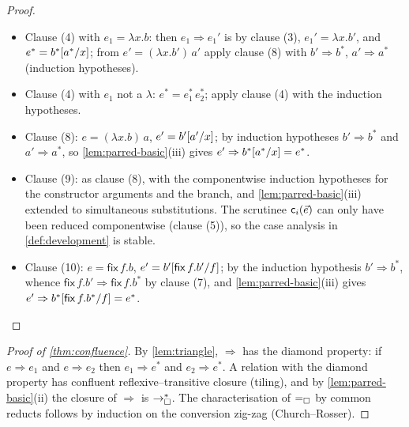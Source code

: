 \begin{proof}
\begin{itemize}[leftmargin=2em]
  is designed for; the symmetric configuration --- step fires the
  redex, development likewise --- is clause (9) below.)
\item Clause (4) with $e_1 = \lambda x.b$: then $e_1 \Rightarrow e_1'$
  is by clause (3), $e_1' = \lambda x.b'$, and $e^{\ast} =
  b^{\ast}[a^{\ast}/x]$; from $e' = (\lambda x.b')\,a'$ apply
  clause (8) with $b' \Rightarrow b^{\ast}$, $a' \Rightarrow a^{\ast}$
  (induction hypotheses).
\item Clause (4) with $e_1$ not a $\lambda$: $e^{\ast} =
  e_1^{\ast}\,e_2^{\ast}$; apply clause (4) with the induction
  hypotheses.
\item Clause (8): $e = (\lambda x.b)\,a$, $e' = b'[a'/x]$; by
  induction hypotheses $b' \Rightarrow b^{\ast}$ and $a' \Rightarrow
  a^{\ast}$, so \cref{lem:parred-basic}(iii) gives $e' \Rightarrow
  b^{\ast}[a^{\ast}/x] = e^{\ast}$.
\item Clause (9): as clause (8), with the componentwise induction
  hypotheses for the constructor arguments and the branch, and
  \cref{lem:parred-basic}(iii) extended to simultaneous substitutions.
  The scrutinee $\mathsf{c}_i(\vec{e})$ can only have been reduced
  componentwise (clause (5)), so the case analysis in
  \cref{def:development} is stable.
\item Clause (10): $e = \mathsf{fix}\,f.b$, $e' =
  b'[\mathsf{fix}\,f.b'/f]$; by the induction hypothesis $b'
  \Rightarrow b^{\ast}$, whence $\mathsf{fix}\,f.b' \Rightarrow
  \mathsf{fix}\,f.b^{\ast}$ by clause (7), and
  \cref{lem:parred-basic}(iii) gives $e' \Rightarrow
  b^{\ast}[\mathsf{fix}\,f.b^{\ast}/f] = e^{\ast}$.
\end{itemize}
\end{proof}

\begin{proof}[Proof of \cref{thm:confluence}]
By \cref{lem:triangle}, $\Rightarrow$ has the diamond property: if $e
\Rightarrow e_1$ and $e \Rightarrow e_2$ then $e_1 \Rightarrow e^{\ast}$
and $e_2 \Rightarrow e^{\ast}$.  A relation with the diamond property
has confluent reflexive--transitive closure (tiling), and by
\cref{lem:parred-basic}(ii) the closure of $\Rightarrow$ is $\rightarrow_{\square}^{*}$.
The characterisation of $=_{\square}$ by common reducts follows by induction
on the conversion zig-zag (Church--Rosser).
\end{proof}
